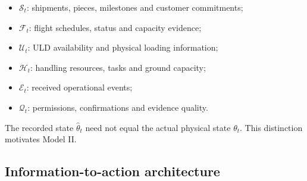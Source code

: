 \documentclass[10pt,a4paper]{article}
\theoremstyle{plain}
\theoremstyle{definition}
\theoremstyle{remark}
\begin{document}
\begin{itemize}[leftmargin=18pt,itemsep=2pt]
\item \(\mathcal S_t\): shipments, pieces, milestones
and customer commitments;
\item \(\mathcal F_t\): flight schedules,
status and capacity evidence;
\item \(\mathcal U_t\): ULD availability
and physical loading information;
\item \(\mathcal H_t\): handling resources,
tasks and ground capacity;
\item \(\mathcal E_t\): received operational events;
\item \(\mathcal Q_t\): permissions,
confirmations and evidence quality.
\end{itemize}

The recorded state \(\widehat\theta_t\) need not
equal the actual physical state \(\theta_t\).
This distinction motivates Model II.

\subsection{Information-to-action architecture}
\end{document}
